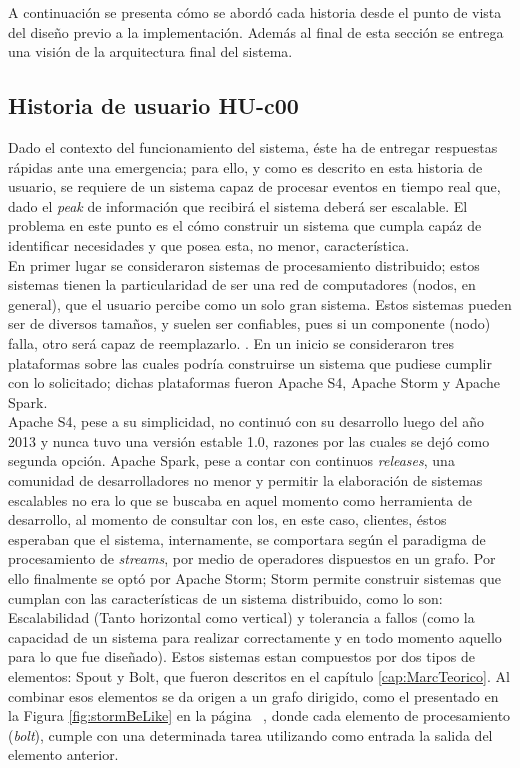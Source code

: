 A continuación se presenta cómo se abordó cada historia desde el punto de vista del diseño previo a la implementación. Además al final de esta sección se entrega una visión de la arquitectura final del sistema.

\subsection{Historia de usuario HU-c00}
\label{subsec:HU-c00}

Dado el contexto del funcionamiento del sistema, éste ha de entregar respuestas rápidas ante una emergencia; para ello, y como es descrito en esta historia de usuario, se requiere de un sistema capaz de procesar eventos en tiempo real que, dado el \textit{peak} de información que recibirá el sistema deberá ser escalable. El problema en este punto es el cómo construir un sistema que cumpla capáz de identificar necesidades y que posea esta, no menor, característica.\\

En primer lugar se consideraron sistemas de procesamiento distribuido; estos sistemas tienen la particularidad de ser una red de computadores (nodos, en general), que el usuario percibe como un solo gran sistema. Estos sistemas pueden ser de diversos tamaños, y suelen ser confiables, pues si un componente (nodo) falla, otro será capaz de reemplazarlo. \cite{DefSPD}. En un inicio se consideraron tres plataformas sobre las cuales podría construirse un sistema que pudiese cumplir con lo solicitado; dichas plataformas fueron Apache S4, Apache Storm y Apache Spark.\\

Apache S4, pese a su simplicidad, no continuó con su desarrollo luego del año 2013 y nunca tuvo una versión estable 1.0, razones por las cuales se dejó como segunda opción. Apache Spark, pese a contar con continuos \textit{releases}, una comunidad de desarrolladores no menor y permitir la elaboración de sistemas escalables no era lo que se buscaba en aquel momento como herramienta de desarrollo, al momento de consultar con los, en este caso, clientes, éstos esperaban que el sistema, internamente, se comportara según el paradigma de procesamiento de \textit{streams}, por medio de operadores dispuestos en un grafo. Por ello finalmente se optó por Apache Storm; Storm permite construir sistemas que cumplan con las características de un sistema distribuido, como lo son: Escalabilidad (Tanto horizontal como vertical) y tolerancia a fallos (como la capacidad de un sistema para realizar correctamente y en todo momento aquello para lo que fue diseñado). Estos sistemas estan compuestos por dos tipos de elementos: Spout y Bolt, que fueron descritos en el capítulo \ref{cap:MarcTeorico}. Al combinar esos elementos se da origen a un grafo dirigido, como el presentado en la Figura \ref{fig:stormBeLike} en la página ~\pageref{fig:stormBeLike}, donde cada elemento de procesamiento (\textit{bolt}), cumple con una determinada tarea utilizando como entrada la salida del elemento anterior.\\

